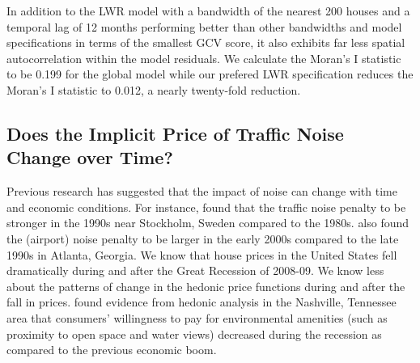 \documentclass{article}\usepackage{graphicx, color}
\begin{document}
In addition to the LWR model with a bandwidth of the nearest 200 houses and a temporal lag of 12 months performing better than other bandwidths and model specifications in terms of the smallest GCV score, it also exhibits far less spatial autocorrelation within the model residuals. We calculate the Moran’s I statistic to be 0.199 for the global model while our prefered LWR specification reduces the Moran's I statistic to 0.012, a nearly twenty-fold reduction. 

\subsection{Does the Implicit Price of Traffic Noise Change over Time?}

Previous research has suggested that the impact of noise can change with time and economic conditions. For instance, \citet{Wilhelmsson2000} found that the traffic noise penalty to be stronger in the 1990s near Stockholm, Sweden compared to the 1980s. \citet{Cohen2009} also found the (airport) noise penalty to be larger in the early 2000s compared to the late 1990s in Atlanta, Georgia. We know that house prices in the United States fell dramatically during and after the Great Recession of 2008-09. We know less about the patterns of change in the hedonic price functions during and after the fall in prices. \citet{Cho2011b} found evidence from hedonic analysis in the Nashville, Tennessee area that consumers' willingness to pay for environmental amenities (such as proximity to open space and water views) decreased during the recession as compared to the previous economic boom. 
\end{document}

